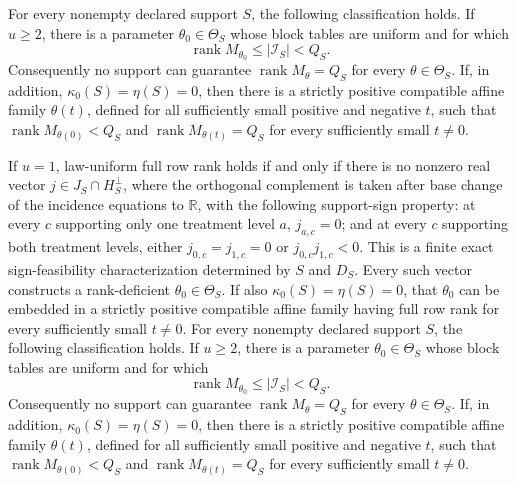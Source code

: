 For every nonempty declared support \(S\), the following classification holds.  If \(u\geq 2\), there is a parameter \(\theta_0\in\Theta_S\) whose block tables are uniform and for which
\[
\operatorname{rank}M_{\theta_0}\leq |\mathcal I_S|<Q_S.
\]
Consequently no support can guarantee \(\operatorname{rank}M_\theta=Q_S\) for every \(\theta\in\Theta_S\).  If, in addition, \(\kappa_0(S)=\eta(S)=0\), then there is a strictly positive compatible affine family \(\theta(t)\), defined for all sufficiently small positive and negative \(t\), such that \(\operatorname{rank}M_{\theta(0)}<Q_S\) and \(\operatorname{rank}M_{\theta(t)}=Q_S\) for every sufficiently small \(t\neq0\).

If \(u=1\), law-uniform full row rank holds if and only if there is no nonzero real vector \(j\in J_S\cap H_S^\perp\), where the orthogonal complement is taken after base change of the incidence equations to \(\mathbb R\), with the following support-sign property: at every \(c\) supporting only one treatment level \(a\), \(j_{a,c}=0\); and at every \(c\) supporting both treatment levels, either \(j_{0,c}=j_{1,c}=0\) or \(j_{0,c}j_{1,c}<0\).  This is a finite exact sign-feasibility characterization determined by \(S\) and \(D_S\).  Every such vector constructs a rank-deficient \(\theta_0\in\Theta_S\).  If also \(\kappa_0(S)=\eta(S)=0\), that \(\theta_0\) can be embedded in a strictly positive compatible affine family having full row rank for every sufficiently small \(t\neq0\).
For every nonempty declared support \(S\), the following classification holds.  If \(u\geq 2\), there is a parameter \(\theta_0\in\Theta_S\) whose block tables are uniform and for which
\[
\operatorname{rank}M_{\theta_0}\leq |\mathcal I_S|<Q_S.
\]
Consequently no support can guarantee \(\operatorname{rank}M_\theta=Q_S\) for every \(\theta\in\Theta_S\).  If, in addition, \(\kappa_0(S)=\eta(S)=0\), then there is a strictly positive compatible affine family \(\theta(t)\), defined for all sufficiently small positive and negative \(t\), such that \(\operatorname{rank}M_{\theta(0)}<Q_S\) and \(\operatorname{rank}M_{\theta(t)}=Q_S\) for every sufficiently small \(t\neq0\).

